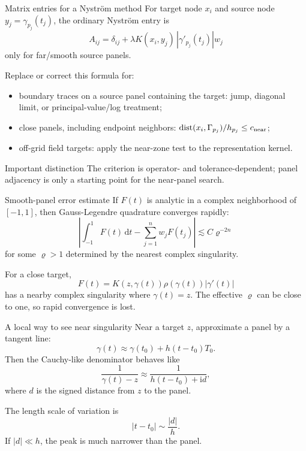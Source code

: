 \documentclass[aspectratio=169,11pt]{beamer}
\newcommand{\dd}{\,\mathrm d}
\newcommand{\ii}{\mathrm i}
\DeclareMathOperator{\dist}{dist}
\begin{document}
\begin{frame}{Matrix entries for a Nystr\"om method}
\small
For target node $x_i$ and source node $y_j=\gamma_{p_j}(t_j)$, the ordinary
Nystr\"om entry is
\[
  A_{ij}
  =
  \delta_{ij}
  +\lambda
  K(x_i,y_j)\,|\gamma'_{p_j}(t_j)|w_j
\]
only for far/smooth source panels.

Replace or correct this formula for:
\begin{itemize}
  \item boundary traces on a source panel containing the target: jump, diagonal
  limit, or principal-value/log treatment;
  \item close panels, including endpoint neighbors:
  $\dist(x_i,\Gamma_{p_j})/h_{p_j}\le c_{\rm near}$;
  \item off-grid field targets: apply the near-zone test to the representation kernel.
\end{itemize}

\begin{block}{Important distinction}
The criterion is operator- and tolerance-dependent; panel adjacency is only a
starting point for the near-panel search.
\end{block}
\end{frame}

\begin{frame}{Smooth-panel error estimate}
\small
If $F(t)$ is analytic in a complex neighborhood of $[-1,1]$, then Gauss-Legendre quadrature converges rapidly:
\[
  \left|
  \int_{-1}^1F(t)\dd t-\sum_{j=1}^n w_jF(t_j)
  \right|
  \lesssim C\varrho^{-2n}
\]
for some $\varrho>1$ determined by the nearest complex singularity.

\vspace{2mm}
For a close target,
\[
  F(t)=K(z,\gamma(t))\rho(\gamma(t))|\gamma'(t)|
\]
has a nearby complex singularity where $\gamma(t)=z$.
The effective $\varrho$ can be close to one, so rapid convergence is lost.
\end{frame}

\begin{frame}{A local way to see near singularity}
\small
Near a target $z$, approximate a panel by a tangent line:
\[
  \gamma(t)\approx \gamma(t_0)+h(t-t_0)T_0.
\]
Then the Cauchy-like denominator behaves like
\[
  \frac{1}{\gamma(t)-z}
  \approx
  \frac{1}{h(t-t_0)+\ii d},
\]
where $d$ is the signed distance from $z$ to the panel.

\vspace{2mm}
The length scale of variation is
\[
  |t-t_0|\sim \frac{|d|}{h}.
\]
If $|d|\ll h$, the peak is much narrower than the panel.
\end{frame}
\end{document}

